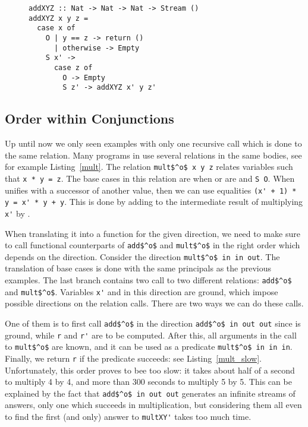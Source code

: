 \begin{figure}[!t]
  \centering
  \begin{minipage}{\columnwidth}
    \begin{lstlisting}[label={add_x_y_z}, caption={Function for \lstinline{addo in in in} direction}, captionpos=b, frame=tb]
addXYZ :: Nat -> Nat -> Nat -> Stream ()
addXYZ x y z =
  case x of
    O | y == z -> return ()
      | otherwise -> Empty
    S x' ->
      case z of
        O -> Empty
        S z' -> addXYZ x' y z'
    \end{lstlisting}
  \end{minipage}
\end{figure}

\subsection{Order within Conjunctions}

Up until now we only seen examples with only one recursive call which is done to the same relation.
Many programs in \mk use several relations in the same bodies, see for example Listing~\ref{mult}.
The relation \lstinline{mult$^o$ x y z} relates variables such that \lstinline{x * y = z}.
The base cases in this relation are when \x or \y are \zero and \lstinline{S O}.
When \x unifies with a successor of another value, then we can use equalities \lstinline{(x' + 1) * y = x' * y + y}.
This is done by adding \y to the intermediate result of multiplying \lstinline{x'} by \y.

When translating it into a function for the given direction, we need to make sure to call functional counterparts of \lstinline{add$^o$} and \lstinline{mult$^o$} in the right order which depends on the direction.
Consider the direction \lstinline{mult$^o$ in in out}.
The translation of base cases is done with the same principals as the previous examples.
The last \conde branch contains two call to two different relations: \lstinline{add$^o$} and \lstinline{mult$^o$}.
Variables \lstinline{x'} and \y in this direction are ground, which impose possible directions on the relation calls.
There are two ways we can do these calls.

One of them is to first call \lstinline{add$^o$} in the direction \lstinline{add$^o$ in out out} since \y is ground, while \lstinline{r} and \lstinline{r'} are to be computed.
After this, all arguments in the call to \lstinline{mult$^o$} are known, and it can be used as a predicate \lstinline{mult$^o$ in in in}.
Finally, we return \lstinline{r} if the predicate succeeds: see Listing~\ref{mult_slow}.
Unfortunately, this order proves to bee too slow: it takes about half of a second to multiply 4 by 4, and more than 300 seconds to multiply 5 by 5.
This can be explained by the fact that \lstinline{add$^o$ in out out} generates an infinite streams of answers, only one which succeeds in multiplication, but considering them all even to find the first (and only) answer to \lstinline{multXY'} takes too much time.

